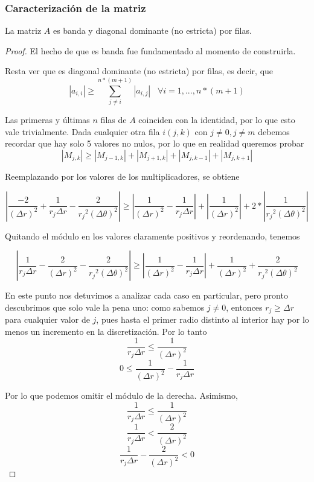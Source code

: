 \subsubsection{Caracterización de la matriz}

\begin{proposition}

La matriz $A$ es banda y diagonal dominante (no estricta) por filas.

\begin{proof}

El hecho de que es banda fue fundamentado al momento de construirla.

Resta ver que es diagonal dominante (no estricta) por filas, es decir, que $$|a_{i, i}| \geq \sum\limits_{j \neq i}^{n*(m+1)} |a_{i, j}| \hspace{10pt} \forall i = 1, ..., n*(m+1)$$

Las primeras y últimas $n$ filas de $A$ coinciden con la identidad, por lo que esto vale trivialmente. Dada cualquier otra fila $i(j, k)$ con $j \neq 0, j \neq m$ debemos recordar que hay solo 5 valores no nulos, por lo que en realidad queremos probar $$|M_{j, k}| \geq |M_{j-1, k}| + |M_{j+1, k}| + |M_{j, k-1}| + |M_{j, k+1}|$$

Reemplazando por los valores de los multiplicadores, se obtiene

$$\left|\frac{-2}{(\Delta r)^2} + \frac{1}{r_j \Delta r} - \frac{2}{{r_j}^2 (\Delta \theta)^2}\right| \geq \left|\frac{1}{(\Delta r)^2} - \frac{1}{r_j \Delta r}\right| + \left|\frac{1}{(\Delta r)^2}\right| + 2 * \left|\frac{1}{{r_j}^2(\Delta \theta)^2}\right| $$

Quitando el módulo en los valores claramente positivos y reordenando, tenemos

$$\left|\frac{1}{r_j \Delta r} - \frac{2}{(\Delta r)^2} - \frac{2}{{r_j}^2 (\Delta \theta)^2}\right| \geq \left|\frac{1}{(\Delta r)^2} - \frac{1}{r_j \Delta r}\right| + \frac{1}{(\Delta r)^2} + \frac{2}{{r_j}^2(\Delta \theta)^2} $$

En este punto nos detuvimos a analizar cada caso en particular, pero pronto descubrimos que solo vale la pena uno:
como sabemos $j \neq 0$, entonces $r_j \geq \Delta r$ para cualquier valor de $j$, pues hasta el primer radio distinto al interior hay por lo menos un incremento en la discretización. Por lo tanto 
$$\frac{1}{r_j \Delta r} \leq \frac{1}{(\Delta r)^2}$$
$$0 \leq \frac{1}{(\Delta r)^2} - \frac{1}{r_j \Delta r}$$

Por lo que podemos omitir el módulo de la derecha. Asimismo, 
$$ \frac{1}{r_j \Delta r} \leq \frac{1}{(\Delta r)^2} $$
$$ \frac{1}{r_j \Delta r} < \frac{2}{(\Delta r)^2} $$
$$ \frac{1}{r_j \Delta r} - \frac{2}{(\Delta r)^2} < 0 $$


\end{proof}
\end{proposition}
